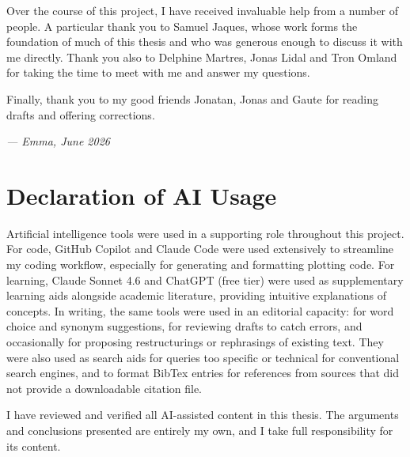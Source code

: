 \documentclass[USenglish]{uiomasterthesis}
\begin{document}
Over the course of this project, I have received invaluable help from a number of people. A particular thank you to Samuel Jaques, whose work forms the foundation of much of this thesis and who was generous enough to discuss it with me directly. Thank you also to Delphine Martres, Jonas Lidal and Tron Omland for taking the time to meet with me and answer my questions.

Finally, thank you to my good friends Jonatan, Jonas and Gaute for reading drafts and offering corrections.

\hspace{0.5cm} \textit{--- Emma, June 2026}

\chapter*{Declaration of AI Usage}

Artificial intelligence tools were used in a supporting role throughout this project. For code, GitHub Copilot and Claude Code were used extensively to streamline my coding workflow, especially for generating and formatting plotting code. For learning, Claude Sonnet 4.6 and ChatGPT (free tier) were used as supplementary learning aids alongside academic literature, providing intuitive explanations of concepts. In writing, the same tools were used in an editorial capacity: for word choice and synonym suggestions, for reviewing drafts to catch errors, and occasionally for proposing restructurings or rephrasings of existing text. They were also used as search aids for queries too specific or technical for conventional search engines, and to format BibTex entries for references from sources that did not provide a downloadable citation file. 

I have reviewed and verified all AI-assisted content in this thesis. The arguments and conclusions presented are entirely my own, and I take full responsibility for its content.

\tableofcontents{}

\mainmatter{}






\printbibliography{}

\appendix
{}


\backmatter{}
\end{document}
